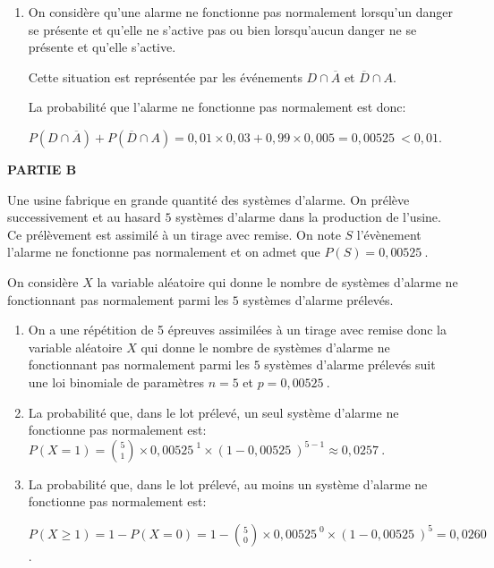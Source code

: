 \documentclass[10pt]{article}
\providecommand{\np}[2][]{{#2~#1}}
\providecommand{\ds}{\displaystyle}
\begin{document}
\begin{enumerate}
\item On considère qu'une alarme ne fonctionne pas normalement lorsqu'un danger se présente et qu'elle ne s'active pas ou bien lorsqu'aucun danger ne se présente et qu'elle s'active.

Cette situation est représentée par les événements $D\cap \overline{A}$ et $\overline{D}\cap A$.

La probabilité que l'alarme ne fonctionne pas normalement est donc:

$P\left (D\cap \overline{A}\right )+ P\left (\overline{D}\cap A\right )
=  0,01\times 0,03 + 0,99\times 0,005 = \np{0,00525} < 0,01$.

\end{enumerate}

\medskip

\textbf{PARTIE B}

\medskip

Une usine fabrique en grande quantité des systèmes d'alarme. On prélève successivement et au hasard $5$ systèmes d'alarme dans la production de l'usine. Ce prélèvement est assimilé à un tirage avec remise.
On note $S$ l'évènement \og  l'alarme ne fonctionne pas normalement \fg{}  et on admet que $P(S) = \np{0,00525}$.

On considère $X$ la variable aléatoire qui donne le nombre de systèmes d'alarme ne fonctionnant pas normalement parmi les $5$ systèmes d'alarme prélevés.





\begin{enumerate}
\item On a une répétition de 5 épreuves  assimilées à un tirage avec remise donc  la variable aléatoire $X$ qui donne le nombre de systèmes d'alarme ne fonctionnant pas normalement parmi les $5$ systèmes d'alarme prélevés suit une loi binomiale de paramètres $n=5$ et $p=\np{0,00525}$.



\item La probabilité que, dans le lot prélevé, un seul système d'alarme ne fonctionne pas normalement est:
$P(X=1) = \ds\binom{5}{1} \times \np{0,00525}^1 \times (1-\np{0,00525})^{5-1}
\approx \np{0,0257}$.

\item La probabilité que, dans le lot prélevé, au moins un système d'alarme ne fonctionne pas normalement est:

$P(X\geqslant 1) = 1-P(X=0) = 1- \ds\binom{5}{0} \times \np{0,00525}^0 \times (1-\np{0,00525})^5 = \np{0,0260}$.

\end{enumerate}
\end{document}
